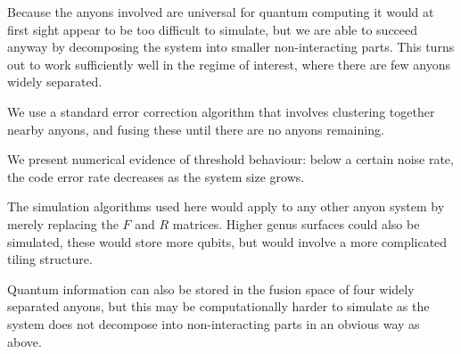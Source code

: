 Because the anyons involved are universal for quantum computing it
would at first sight appear to be too difficult to simulate,
but we are able to succeed anyway by decomposing the system into smaller
non-interacting parts. This turns out to work 
sufficiently well in the regime of interest, where there are
few anyons widely separated.

We use a standard error correction algorithm that involves
clustering together nearby anyons, and fusing these until there
are no anyons remaining.

We present numerical evidence of threshold behaviour:
below a certain noise rate, the code error rate decreases as
the system size grows.

The simulation algorithms used here
would apply to any other anyon system by merely replacing
the $F$ and $R$ matrices.
Higher genus surfaces could also be simulated, these would store
more qubits, but would involve a more complicated tiling structure.

Quantum information can also be stored in the fusion space of
four widely separated anyons, but this may be computationally
harder to simulate
as the system does not decompose into non-interacting parts in an
obvious way as above.




